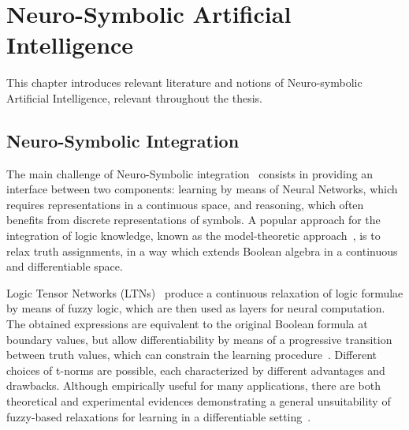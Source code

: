 \chapter{Neuro-Symbolic Artificial Intelligence}
\label{chap:nesyintro}

This chapter introduces relevant literature and notions of Neuro-symbolic Artificial Intelligence, relevant throughout the thesis.

\section{Neuro-Symbolic Integration}
The main challenge of Neuro-Symbolic integration~\cite{besold2021neural} consists in providing an interface between two components: learning by means of Neural Networks, which requires representations in a continuous space, and reasoning, which often benefits from discrete representations of symbols.
A popular approach for the integration of logic knowledge, known as the model-theoretic approach~\cite{marra2024statistical}, is to relax truth assignments, in a way which extends Boolean algebra in a continuous and differentiable space.

Logic Tensor Networks (LTNs)~\cite{badreddine2022logic} produce a continuous relaxation of logic formulae by means of fuzzy logic, which are then used as layers for neural computation.
The obtained expressions are equivalent to the original Boolean formula at boundary values, but allow differentiability by means of a progressive transition between truth values, which can constrain the learning procedure~\cite{gnecco2015foundations,melacci2021domain}. Different choices of t-norms are possible, each characterized by different advantages and drawbacks. Although empirically useful for many applications, there are both theoretical and experimental evidences demonstrating a general unsuitability of fuzzy-based relaxations for learning in a differentiable setting~\cite{van2022analyzing}.

